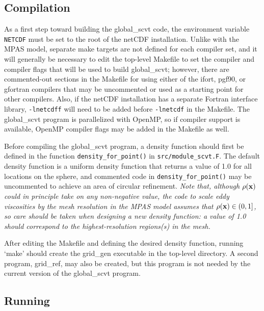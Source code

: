 \subsection{Compilation}
                                                                                             
As a first step toward building the global\_scvt code, the environment variable                     
{\tt NETCDF} must be set to the root of the netCDF installation. Unlike with the MPAS model, separate make targets are not
defined for each compiler set, and it will generally be necessary to edit the top-level Makefile to set the compiler and compiler flags                 
that will be used to build global\_scvt; however, there are commented-out sections in the Makefile for using either of the ifort, pgf90, or gfortran compilers that may be uncommented or used as a starting point for other compilers. Also, if the netCDF installation has a separate Fortran interface library, {\tt -lnetcdff} will need to be added before {\tt -lnetcdf} in the Makefile. The global\_scvt program is parallelized with OpenMP, so if compiler support is available, OpenMP compiler flags may be added
in the Makefile as well.                      

Before compiling the global\_scvt program, a density function should first be defined in the function {\tt density\_for\_point()} in {\tt src/module\_scvt.F}. The default density function is a uniform density function that returns a value of 1.0 for all locations
on the sphere, and commented code in {\tt density\_for\_point()} may be uncommented to achieve an area of circular refinement. {\em Note that, although $\rho({\bf x})$ could in principle take on any non-negative value, the code to scale eddy viscosities by the mesh resolution in the MPAS model assumes that $\rho({\bf x}) \in (0,1]$, so care should be taken when designing a new density function: a value of 1.0 should correspond to the highest-resolution regions(s) in the mesh.}                                      
                                                                                                
After editing the Makefile and defining the desired density function, running `make' should create the grid\_gen executable 
in the top-level directory. A second program, grid\_ref, may also be created, but this program is not needed by the current version 
of the global\_scvt program.

\subsection{Running}

